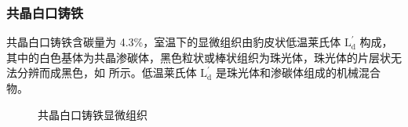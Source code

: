     \subsubsection{共晶白口铸铁}
    共晶白口铸铁含碳量为 4.3\%，室温下的显微组织由豹皮状低温莱氏体 $\text{L}_\text{d}^{'}$ 构成，其中的白色基体为共晶渗碳体，黑色粒状或棒状组织为珠光体，珠光体的片层状无法分辨而成黑色，如 所示。低温莱氏体 $\text{L}_\text{d}^{'}$ 是珠光体和渗碳体组成的机械混合物。
    \begin{figure}[!ht]
        \hspace{20pt}
        \hspace{20pt}
        \caption{共晶白口铸铁显微组织\label{fig:n6}}
    \end{figure}

